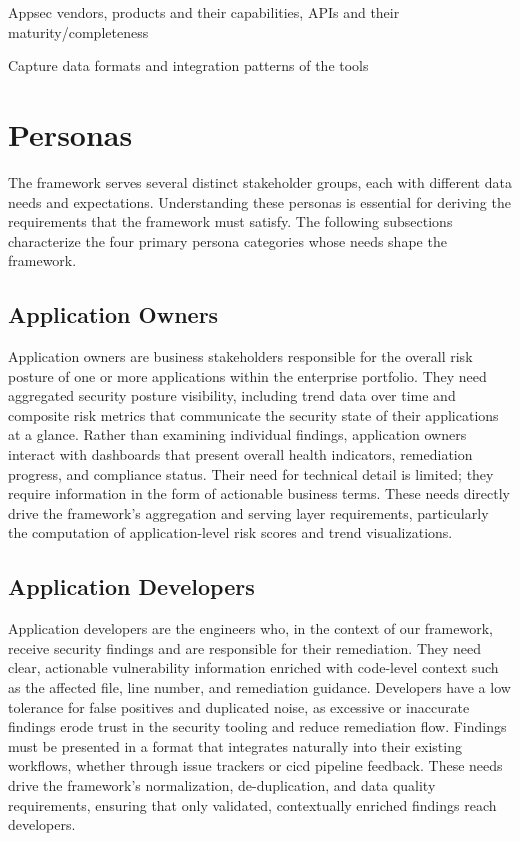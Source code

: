 Appsec vendors, products and their capabilities, APIs and their maturity/completeness

Capture data formats and integration patterns of the tools



\section{Personas}
\label{sec:personas}

The framework serves several distinct stakeholder groups, each with different data needs and expectations. Understanding these personas is essential for deriving the requirements that the framework must satisfy. The following subsections characterize the four primary persona categories whose needs shape the framework.

\subsection{Application Owners}

Application owners are business stakeholders responsible for the overall risk posture of one or more applications within the enterprise portfolio. They need aggregated security posture visibility, including trend data over time and composite risk metrics that communicate the security state of their applications at a glance. Rather than examining individual findings, application owners interact with dashboards that present overall health indicators, remediation progress, and compliance status. Their need for technical detail is limited; they require information in the form of actionable business terms. These needs directly drive the framework's aggregation and serving layer requirements, particularly the computation of application-level risk scores and trend visualizations.

\subsection{Application Developers}

Application developers are the engineers who, in the context of our framework, receive security findings and are responsible for their remediation. They need clear, actionable vulnerability information enriched with code-level context such as the affected file, line number, and remediation guidance. Developers have a low tolerance for false positives and duplicated noise, as excessive or inaccurate findings erode trust in the security tooling and reduce remediation flow. Findings must be presented in a format that integrates naturally into their existing workflows, whether through issue trackers or \gls{cicd} pipeline feedback. These needs drive the framework's normalization, de-duplication, and data quality requirements, ensuring that only validated, contextually enriched findings reach developers.

